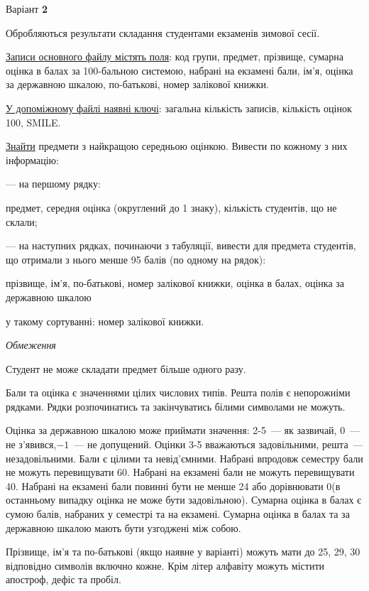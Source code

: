 \documentclass[11pt, ukrainian]{article}
\begin{document}
\par
\newpage
{\center Варіант  \No \textbf { 2 }\par}
\bigskip
Обробляються результати складання студентами екзаменів зимової сесії.

\underline{Записи основного файлу містять поля}: код групи, предмет, прізвище, сумарна оцінка в балах за 100-бальною системою, набрані на екзамені бали, ім’я, оцінка за державною шкалою, по-батькові, номер залікової книжки.

\underline{У допоміжному файлі наявні ключі}: загальна кількість записів, кількість оцінок 100, SMILE.

\underline{Знайти} предмети з найкращою середньою оцінкою. Вивести по кожному з них інформацію:\par
{\noindent}--- на першому рядку:\par
предмет, середня оцінка (округлений до 1 знаку), кількість студентів, що не склали;

{\noindent}--- на наступних рядках, починаючи з табуляції, вивести для предмета студентів, що отримали з нього менше 95 балів (по одному на рядок):\par
прізвище, ім’я, по-батькові, номер залікової книжки, оцінка в балах, оцінка за державною шкалою

{\noindent}у такому сортуванні: номер залікової книжки.


\bigskip\textit{Обмеження}

Студент не може складати предмет більше одного разу.

Бали та оцінка є значеннями цілих числових типів. Решта полів є непорожніми рядками.
Рядки розпочинатись та закінчуватись білими символами не можуть.

Оцінка за державною шкалою може приймати значення: 2-5~--- як зазвичай, 0~--- не з’явився,$-1$~--- не допущений. 
Оцінки 3-5 вважаються задовільними, решта~--- незадовільними. 
Бали є цілими та невід’ємними.
Набрані впродовж семестру бали не можуть перевищувати 60. 
Набрані на екзамені бали не можуть перевищувати 40. 
Набрані на екзамені бали повинні бути не менше 24 або дорівнювати 0(в останньому випадку оцінка не може бути задовільною). 
Сумарна оцінка в балах є сумою балів, набраних у семестрі та на екзамені.
Сумарна оцінка в балах та за державною шкалою мають бути узгоджені між собою.

Прізвище, ім’я та по-батькові (якщо наявне у варіанті) можуть мати до 25, 29, 30 відповідно символів включно кожне. 
Крім літер алфавіту можуть містити апостроф, дефіс та пробіл.
\end{document}
